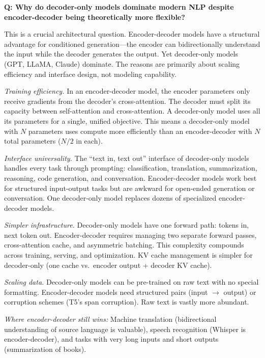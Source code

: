 \begin{interviewq}
\textbf{Q: Why do decoder-only models dominate modern NLP despite encoder-decoder being theoretically more flexible?}

 \quad {} \quad \badgefreq{\freqhigh}

\stronganswer This is a crucial architectural question. Encoder-decoder models have a structural advantage for conditioned generation---the encoder can bidirectionally understand the input while the decoder generates the output. Yet decoder-only models (GPT, LLaMA, Claude) dominate. The reasons are primarily about scaling efficiency and interface design, not modeling capability.

\textit{Training efficiency.} In an encoder-decoder model, the encoder parameters only receive gradients from the decoder's cross-attention. The decoder must split its capacity between self-attention and cross-attention. A decoder-only model uses all its parameters for a single, unified objective. This means a decoder-only model with $N$ parameters uses compute more efficiently than an encoder-decoder with $N$ total parameters ($N/2$ in each).

\textit{Interface universality.} The ``text in, text out'' interface of decoder-only models handles every task through prompting: classification, translation, summarization, reasoning, code generation, and conversation. Encoder-decoder models work best for structured input-output tasks but are awkward for open-ended generation or conversation. One decoder-only model replaces dozens of specialized encoder-decoder models.

\textit{Simpler infrastructure.} Decoder-only models have one forward path: tokens in, next token out. Encoder-decoder requires managing two separate forward passes, cross-attention cache, and asymmetric batching. This complexity compounds across training, serving, and optimization. KV cache management is simpler for decoder-only (one cache vs.\ encoder output + decoder KV cache).

\textit{Scaling data.} Decoder-only models can be pre-trained on raw text with no special formatting. Encoder-decoder models need structured pairs (input $\to$ output) or corruption schemes (T5's span corruption). Raw text is vastly more abundant.

\textit{Where encoder-decoder still wins:} Machine translation (bidirectional understanding of source language is valuable), speech recognition (Whisper is encoder-decoder), and tasks with very long inputs and short outputs (summarization of books).


\end{interviewq}
